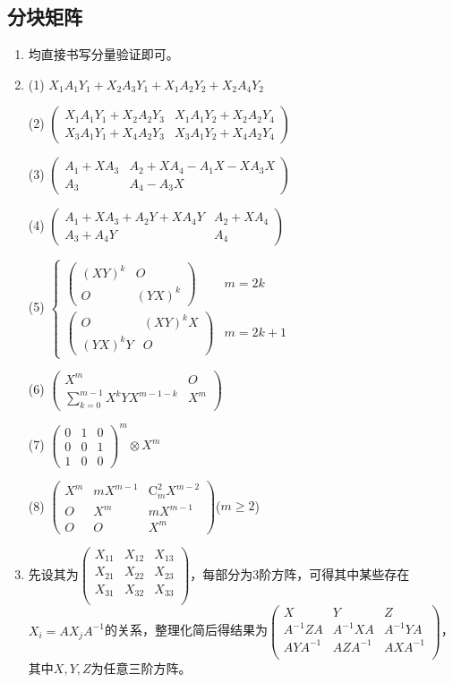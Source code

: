 \documentclass[a4paper,UTF8,fontset=windows]{ctexart}
\begin{document}
\subsection{分块矩阵}
\begin{enumerate}
\item
均直接书写分量验证即可。

\item
(1) $X_1A_1Y_1+X_2A_3Y_1+X_1A_2Y_2+X_2A_4Y_2$

(2) $\begin{pmatrix}X_1A_1Y_1+X_2A_2Y_3&X_1A_1Y_2+X_2A_2Y_4\\X_3A_1Y_1+X_4A_2Y_3&X_3A_1Y_2+X_4A_2Y_4\end{pmatrix}$

(3) $\begin{pmatrix}A_1+XA_3&A_2+XA_4-A_1X-XA_3X\\A_3&A_4-A_3X\end{pmatrix}$

(4) $\begin{pmatrix}A_1+XA_3+A_2Y+XA_4Y&A_2+XA_4\\A_3+A_4Y&A_4\end{pmatrix}$

(5) $\begin{cases}\begin{pmatrix}(XY)^k&O\\O&(YX)^k\end{pmatrix}&m=2k\\\begin{pmatrix}O&(XY)^kX\\(YX)^kY&O\end{pmatrix}&m=2k+1\end{cases}$

(6) $\begin{pmatrix}X^m&O\\\sum_{k=0}^{m-1}{X^kYX^{m-1-k}}&X^m\end{pmatrix}$

(7) $\begin{pmatrix}0&1&0\\0&0&1\\1&0&0\end{pmatrix}^m\otimes X^m$

(8) $\begin{pmatrix}X^m&mX^{m-1}&\mathrm{C}_m^2X^{m-2}\\O&X^m&mX^{m-1}\\O&O&X^m\end{pmatrix}$($m\ge2$)

\item
先设其为$\begin{pmatrix}X_{11}&X_{12}&X_{13}\\X_{21}&X_{22}&X_{23}\\X_{31}&X_{32}&X_{33}\\\end{pmatrix}$，每部分为3阶方阵，可得其中某些存在$X_i=AX_jA^{-1}$的关系，整理化简后得结果为$\begin{pmatrix}X&Y&Z\\A^{-1}ZA&A^{-1}XA&A^{-1}YA\\AYA^{-1}&AZA^{-1}&AXA^{-1}\\\end{pmatrix}$，其中$X,Y,Z$为任意三阶方阵。


\end{enumerate}
\end{document}
